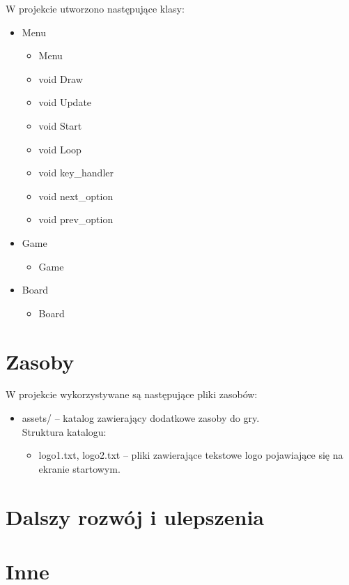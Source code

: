 \documentclass{article}
\begin{document}
W projekcie utworzono następujące klasy:
\begin{itemize}
    \item Menu
        \begin{itemize}
            \item Menu
            \item void Draw
            \item void Update
            \item void Start
            \item void Loop
            \item void key\_handler
            \item void next\_option
            \item void prev\_option
        \end{itemize}
    \item Game
        \begin{itemize}
            \item Game
        \end{itemize}
    \item Board
        \begin{itemize}
            \item Board
        \end{itemize}
\end{itemize}
     
\section{Zasoby}

W projekcie wykorzystywane są następujące pliki zasobów:
    \begin{itemize}
    \item assets/ – katalog zawierający dodatkowe zasoby do gry.\\
    Struktura katalogu:
        \begin{itemize}
            \item logo1.txt, logo2.txt – pliki zawierające tekstowe logo pojawiające się na ekranie startowym.
        \end{itemize}
    \end{itemize}

\section{Dalszy rozwój i ulepszenia}

\section{Inne}
\end{document}
